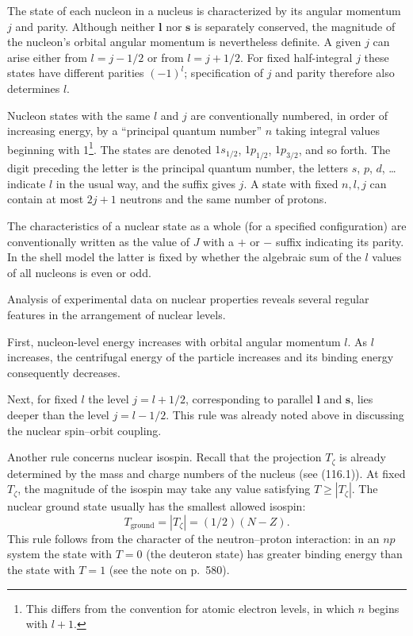 The state of each nucleon in a nucleus is characterized by its angular
momentum $j$ and parity. Although neither $\mathbf l$ nor $\mathbf s$ is
separately conserved, the magnitude of the nucleon's orbital angular momentum
is nevertheless definite. A given $j$ can arise either from $l=j-1/2$ or from
$l=j+1/2$. For fixed half-integral $j$ these states have different parities
$(-1)^l$; specification of $j$ and parity therefore also determines $l$.

Nucleon states with the same $l$ and $j$ are conventionally numbered, in order
of increasing energy, by a ``principal quantum number'' $n$ taking integral
values beginning with 1\footnote{This differs from the convention for atomic
electron levels, in which $n$ begins with $l+1$.}. The states are denoted
$1s_{1/2}$, $1p_{1/2}$, $1p_{3/2}$, and so forth. The digit preceding the
letter is the principal quantum number, the letters $s$, $p$, $d$, \ldots
indicate $l$ in the usual way, and the suffix gives $j$. A state with fixed
$n,l,j$ can contain at most $2j+1$ neutrons and the same number of protons.

The characteristics of a nuclear state as a whole (for a specified
configuration) are conventionally written as the value of $J$ with a $+$ or
$-$ suffix indicating its parity. In the shell model the latter is fixed by
whether the algebraic sum of the $l$ values of all nucleons is even or odd.

Analysis of experimental data on nuclear properties reveals several regular
features in the arrangement of nuclear levels.

First, nucleon-level energy increases with orbital angular momentum $l$. As
$l$ increases, the centrifugal energy of the particle increases and its
binding energy consequently decreases.

Next, for fixed $l$ the level $j=l+1/2$, corresponding to parallel
$\mathbf l$ and $\mathbf s$, lies deeper than the level $j=l-1/2$. This rule
was already noted above in discussing the nuclear spin--orbit coupling.

Another rule concerns nuclear isospin. Recall that the projection $T_\zeta$
is already determined by the mass and charge numbers of the nucleus (see
(116.1)). At fixed $T_\zeta$, the magnitude of the isospin may take any value
satisfying $T\geqslant|T_\zeta|$. The nuclear ground state usually has the
smallest allowed isospin:
\begin{equation}
 T_{\mathrm{ground}}=|T_\zeta|=(1/2)(N-Z).
 \tag{118.7}
\end{equation}
This rule follows from the character of the neutron--proton interaction: in an
$np$ system the state with $T=0$ (the deuteron state) has greater binding
energy than the state with $T=1$ (see the note on p.~580).

